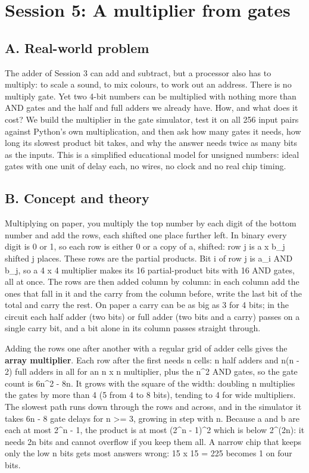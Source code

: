 \documentclass[11pt,a4paper]{article}
\begin{document}
\section{Session 5: A multiplier from gates}

\subsection*{A. Real-world problem}
The adder of Session 3 can add and subtract, but a processor also has to multiply: to scale a sound, to mix colours, to work out an address. There is no multiply gate. Yet two 4-bit numbers can be multiplied with nothing more than AND gates and the half and full adders we already have. How, and what does it cost? We build the multiplier in the gate simulator, test it on all 256 input pairs against Python's own multiplication, and then ask how many gates it needs, how long its slowest product bit takes, and why the answer needs twice as many bits as the inputs. This is a simplified educational model for unsigned numbers: ideal gates with one unit of delay each, no wires, no clock and no real chip timing.

\subsection*{B. Concept and theory}
Multiplying on paper, you multiply the top number by each digit of the bottom number and add the rows, each shifted one place further left. In binary every digit is 0 or 1, so each row is either 0 or a copy of a, shifted: row j is a x b\_j shifted j places. These rows are the partial products. Bit i of row j is a\_i AND b\_j, so a 4 x 4 multiplier makes its 16 partial-product bits with 16 AND gates, all at once. The rows are then added column by column: in each column add the ones that fall in it and the carry from the column before, write the last bit of the total and carry the rest. On paper a carry can be as big as 3 for 4 bits; in the circuit each half adder (two bits) or full adder (two bits and a carry) passes on a single carry bit, and a bit alone in its column passes straight through.

Adding the rows one after another with a regular grid of adder cells gives the \textbf{array multiplier}. Each row after the first needs n cells: n half adders and n(n - 2) full adders in all for an n x n multiplier, plus the n\textasciicircum{}2 AND gates, so the gate count is 6n\textasciicircum{}2 - 8n. It grows with the square of the width: doubling n multiplies the gates by more than 4 (5 from 4 to 8 bits), tending to 4 for wide multipliers. The slowest path runs down through the rows and across, and in the simulator it takes 6n - 8 gate delays for n \textgreater{}= 3, growing in step with n. Because a and b are each at most 2\textasciicircum{}n - 1, the product is at most (2\textasciicircum{}n - 1)\textasciicircum{}2 which is below 2\textasciicircum{}(2n): it needs 2n bits and cannot overflow if you keep them all. A narrow chip that keeps only the low n bits gets most answers wrong: 15 x 15 = 225 becomes 1 on four bits.
\end{document}
